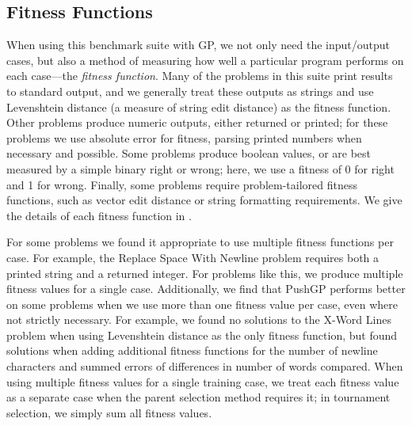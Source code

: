 \documentclass{sig-alternate}
\begin{document}




\subsection{Fitness Functions}

When using this benchmark suite with GP, we not only need the input/output cases, but also a method of measuring how well a particular program performs on each case---the \textit{fitness function}. 
Many of the problems in this suite print results to standard output, and we generally treat these outputs as strings and use Levenshtein distance (a measure of string edit distance) as the fitness function. Other problems produce numeric outputs, either returned or printed; for these problems we use absolute error for fitness, parsing printed numbers when necessary and possible. Some problems produce boolean values, or are best measured by a simple binary right or wrong; here, we use a fitness of 0 for right and 1 for wrong. Finally, some problems require problem-tailored fitness functions, such as vector edit distance or string formatting requirements. We give the details of each fitness function in \cite{helmuth:umass:tr}.

For some problems we found it appropriate to use multiple fitness functions per case. For example, the Replace Space With Newline problem requires both a printed string and a returned integer. For problems like this, we produce multiple fitness values for a single case. Additionally, we find that PushGP performs better on some problems when we use more than one fitness value per case, even where not strictly necessary. For example, we found no solutions to the X-Word Lines problem when using Levenshtein distance as the only fitness function, but found solutions when adding additional fitness functions for the number of newline characters and summed errors of differences in number of words compared. When using multiple fitness values for a single training case, we treat each fitness value as a separate case when the parent selection method requires it; in tournament selection, we simply sum all fitness values.
\end{document}
